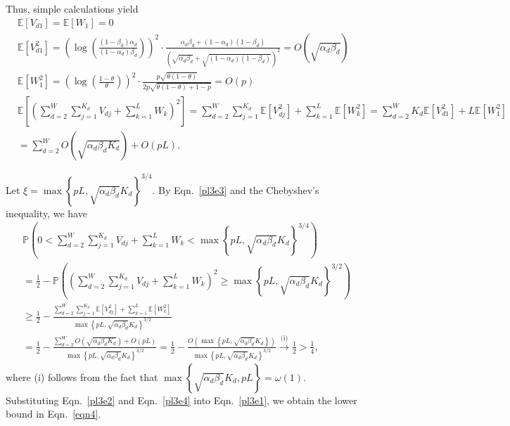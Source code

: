 \documentclass{article}
\newcommand\af{\alpha_d}
\newcommand\bt{\beta_d}
\begin{document}
Thus, simple calculations yield 
\begin{equation} \label{pl3e3}
	\begin{aligned}
		&\mathbb{E}[V_{d1}] = \mathbb{E}[W_1] = 0 \\
		&\mathbb{E}[V_{d1}^2] = \left(\log \left( \frac{(1-\bt)\af}{(1-\af)\bt} \right) \right)^2 \cdot \frac{\af \bt + (1-\af)(1-\bt)}{\left(\sqrt{\af \bt} + \sqrt{(1-\af)(1-\bt)} \right)^2} = O\left( \sqrt{\af \bt} \right) \\
		& \mathbb{E}[W_1^2] = \left( \log \left( \frac{1-\theta}{\theta} \right) \right)^2 \cdot \frac{p\sqrt{\theta(1-\theta)}}{2p\sqrt{\theta(1-\theta) + 1-p}} = O(p) \\
		& \mathbb{E}\left[ \left( \sum_{d=2}^{W} \sum_{j=1}^{K_d} V_{dj} + \sum_{k=1}^{L} W_k \right)^2 \right] = \sum_{d=2}^{W}\sum_{j=1}^{K_d} \mathbb{E}[V_{dj}^2] + \sum_{k=1}^{L}\mathbb{E}[W_k^2] =  \sum_{d=2}^{W} K_d \mathbb{E}[V_{d1}^2] + L\mathbb{E}[W_1^2] \\
            &= \sum_{d=2}^{W}  O\left( \sqrt{\af \bt K_d} \right) + O(pL).
	\end{aligned}
\end{equation}

Let $\xi=  \max \left\{ pL, \sqrt{\af \bt}K_d \right\} ^{3/4}$. By Eqn.~\eqref{pl3e3} and the Chebyshev’s inequality, we have
\begin{equation}\label{pl3e4}
	\begin{aligned}
		&\mathbb{P} \left( 0 < \sum_{d=2}^{W} \sum_{j=1}^{K_d} V_{dj} + \sum_{k=1}^{L} W_k <  \max \left\{ pL, \sqrt{\af \bt}K_d \right\} ^{3/4} \right) \\
		& = \frac{1}{2} - \mathbb{P} \left( \left(\sum_{d=2}^{W} \sum_{j=1}^{K_d} V_{dj} + \sum_{k=1}^{L} W_k\right)^2 \geq \max \left\{ pL, \sqrt{\af \bt}K_d \right\} ^{3/2} \right) \\
		& \geq \frac{1}{2} - \frac{\sum_{d=2}^{W}\sum_{j=1}^{K_d} \mathbb{E}[V_{dj}^2] + \sum_{k=1}^{L}\mathbb{E}[W_k^2]}{ \max \left\{ pL, \sqrt{\af \bt}K_d \right\} ^{3/2}} \\
		& = \frac{1}{2} - \frac{\sum_{d=2}^{W}  O\left( \sqrt{\af \bt K_d} \right) + O(pL)}{ \max \left\{ pL, \sqrt{\af \bt}K_d \right\} ^{3/2}} = \frac{1}{2} - \frac{O( \max \left\{ pL, \sqrt{\af \bt}K_d \right\})}{ \max \left\{ pL, \sqrt{\af \bt}K_d \right\} ^{3/2}} \overset{\text{(i)}}{\rightarrow} \frac{1}{2}> \frac{1}{4},
	\end{aligned}
\end{equation}
where (i) follows from the fact that $\max \left\{ \sqrt{\af \bt}K_d, pL \right\}=\omega(1)$. Substituting Eqn.~\eqref{pl3e2} and Eqn.~\eqref{pl3e4} into Eqn.~\eqref{pl3e1}, we obtain the lower bound in Eqn.~\eqref{eqn4}.
\end{document}
